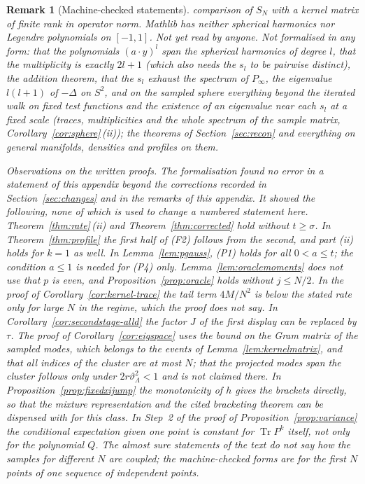 \documentclass[11pt,a4paper]{article}
\theoremstyle{stmt}
\theoremstyle{defn}
\theoremstyle{rmk}
\newtheorem{remark}[theorem]{Remark}
\numberwithin{equation}{section}
\DeclareMathOperator{\Tr}{Tr}
\begin{document}
{\begin{remark}[Machine-checked statements]
comparison of $S_N$ with a kernel matrix of finite rank in operator norm. Mathlib has neither spherical harmonics nor Legendre polynomials on $[-1,1]$. Not yet read by anyone. Not formalised in any form: that the polynomials $(a\cdot y)^l$ span the spherical harmonics of degree $l$, that the multiplicity is exactly $2l+1$ (which also needs the $s_l$ to be pairwise distinct), the addition theorem, that the $s_l$ exhaust the spectrum of $P_\infty$, the eigenvalue $l(l+1)$ of $-\Delta$ on $S^2$, and on the sampled sphere everything beyond the iterated walk on fixed test functions and the existence of an eigenvalue near each $s_l$ at a fixed scale (traces, multiplicities and the whole spectrum of the sample matrix, Corollary~\ref{cor:sphere}\,(ii)); the theorems of Section~\ref{sec:recon} and everything on general manifolds, densities and profiles on them.

\emph{Observations on the written proofs.} The formalisation found no error in a statement of this appendix beyond the corrections recorded in Section~\ref{sec:changes} and in the remarks of this appendix. It showed the following, none of which is used to change a numbered statement here. Theorem~\ref{thm:rate}\,(ii) and Theorem~\ref{thm:corrected} hold without $t\ge\sigma$. In Theorem~\ref{thm:profile} the first half of \textup{(F2)} follows from the second, and part (ii) holds for $k=1$ as well. In Lemma~\ref{lem:pgauss}, (P1) holds for all $0<a\le t$; the condition $a\le1$ is needed for (P4) only. Lemma~\ref{lem:oraclemoments} does not use that $p$ is even, and Proposition~\ref{prop:oracle} holds without $j\le N/2$. In the proof of Corollary~\ref{cor:kernel-trace} the tail term $4M/N^2$ is below the stated rate only for large $N$ in the regime, which the proof does not say. In Corollary~\ref{cor:secondstage-alld} the factor $J$ of the first display can be replaced by $\tau$. The proof of Corollary~\ref{cor:eigspace} uses the bound on the Gram matrix of the sampled modes, which belongs to the events of Lemma~\ref{lem:kernelmatrix}, and that all indices of the cluster are at most $N$; that the projected modes span the cluster follows only under $2r\vartheta_\Lambda^2<1$ and is not claimed there. In Proposition~\ref{prop:fixedxijump} the monotonicity of $h$ gives the brackets directly, so that the mixture representation and the cited bracketing theorem can be dispensed with for this class. In Step~2 of the proof of Proposition~\ref{prop:variance} the conditional expectation given one point is constant for $\Tr P^k$ itself, not only for the polynomial $Q$. The almost sure statements of the text do not say how the samples for different $N$ are coupled; the machine-checked forms are for the first $N$ points of one sequence of independent points.


\end{remark}}
\end{document}
